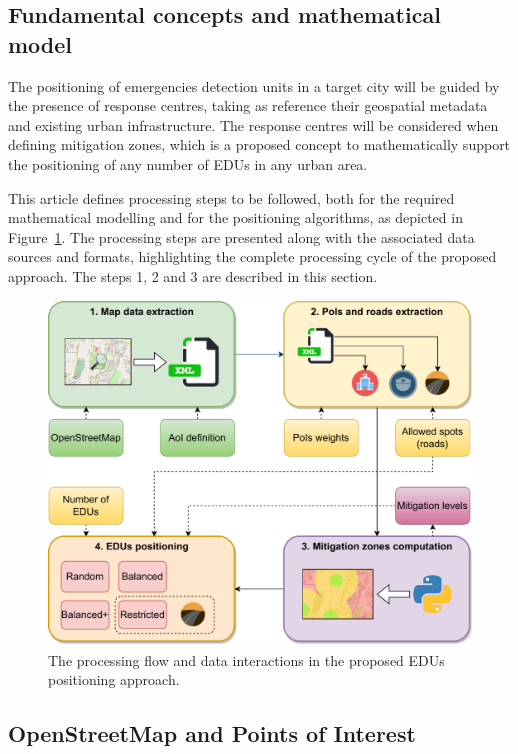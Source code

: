 \begin{refsection}
\section {Fundamental concepts and mathematical model}\label{S:3}

The positioning of emergencies detection units in a target city will be guided by the presence of response centres, taking as reference their geospatial metadata and existing urban infrastructure. The response centres will be considered when defining mitigation zones, which is a proposed concept to mathematically support the positioning of any number of EDUs in any urban area. 

This article defines processing steps to be followed, both for the required mathematical modelling and for the positioning algorithms, as depicted in Figure~\ref{Fig:figFluxograma}. The processing steps are presented along with the associated data sources and formats, highlighting the complete processing cycle of the proposed approach. The steps 1, 2 and 3 are described in this section.

\begin{figure}[htb!]
  \centering
  \includegraphics[width=0.85 \linewidth]{Chapters/2-EDUs/images/flowchart.drawio.pdf}
  \caption{The processing flow and data interactions in the proposed EDUs positioning approach.}\label{Fig:figFluxograma}
\end{figure}


\subsection{OpenStreetMap and Points of Interest}


\end{refsection}
